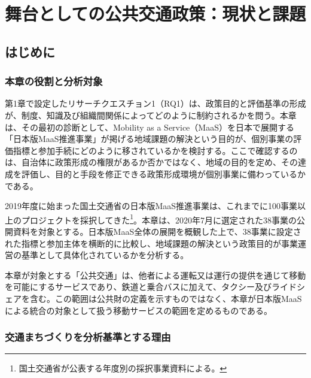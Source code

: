 
\chapter{舞台としての公共交通政策：現状と課題}
\label{chap:public_transport}

\section{はじめに}
\label{sec:ch4_introduction}

\subsection{本章の役割と分析対象}

第1章で設定したリサーチクエスチョン1（RQ1）は、政策目的と評価基準の形成が、制度、知識及び組織間関係によってどのように制約されるかを問う。本章は、その最初の診断として、Mobility as a Service（MaaS）を日本で展開する「日本版MaaS推進事業」が掲げる地域課題の解決という目的が、個別事業の評価指標と参加手続にどのように移されているかを検討する。ここで確認するのは、自治体に政策形成の権限があるか否かではなく、地域の目的を定め、その達成を評価し、目的と手段を修正できる政策形成環境が個別事業に備わっているかである。

2019年度に始まった国土交通省の日本版MaaS推進事業は、これまでに100事業以上のプロジェクトを採択してきた\footnote{国土交通省が公表する年度別の採択事業資料による。}。本章は、2020年7月に選定された38事業の公開資料を対象とする。日本版MaaS全体の展開を概観した上で、38事業に設定された指標と参加主体を横断的に比較し、地域課題の解決という政策目的が事業運営の基準として具体化されているかを分析する。

本章が対象とする「公共交通」は、他者による運転又は運行の提供を通じて移動を可能にするサービスであり、鉄道と乗合バスに加えて、タクシー及びライドシェアを含む。この範囲は公共財の定義を示すものではなく、本章が日本版MaaSによる統合の対象として扱う移動サービスの範囲を定めるものである。

\subsection{交通まちづくりを分析基準とする理由}

